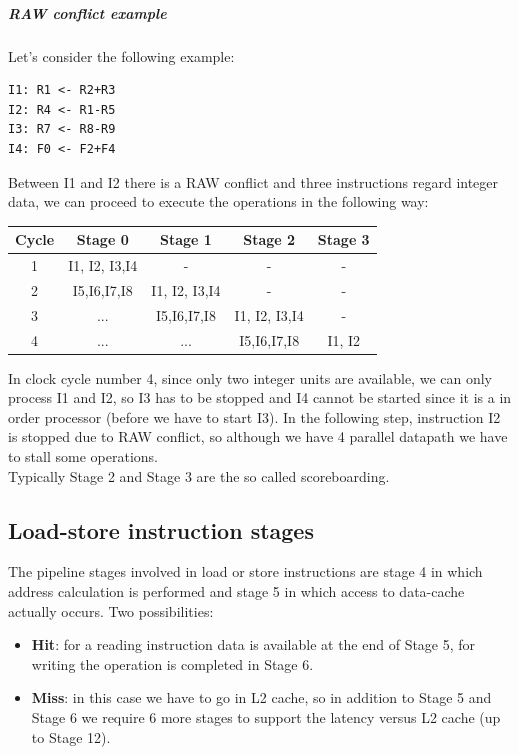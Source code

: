 \subparagraph{RAW conflict example}
Let's consider the following example:
\begin{verbatim}
I1: R1 <- R2+R3
I2: R4 <- R1-R5
I3: R7 <- R8-R9
I4: F0 <- F2+F4
\end{verbatim}

Between I1 and I2 there is a RAW conflict and three instructions regard integer
data, we can proceed to execute the operations in the following way:

\begin{center}
  \begin{tabular}{|c|c|c|c|c|}
  \hline
  Cycle&    Stage 0&    Stage 1&      Stage 2&    Stage 3\\
  \hline
  1&    I1, I2, I3,I4&    - &         - &         -\\
  2&    I5,I6,I7,I8&    I1, I2, I3,I4&    -&          -\\
  3&    ...&        I5,I6,I7,I8&    I1, I2, I3,I4&    -\\
  4&    ...&        ...&        I5,I6,I7,I8&    I1, I2\\
  \hline
  \end{tabular}
\end{center}

In clock cycle number 4, since only two integer units are available, we can
only process I1 and I2, so I3 has to be stopped and I4 cannot be started since
it is a in order processor (before we have to start I3). In the following step,
instruction I2 is stopped due to RAW conflict, so although we have 4 parallel
datapath we have to stall some operations.\\

Typically Stage 2 and Stage 3 are the so called scoreboarding.

\subsection{Load-store instruction stages}
The pipeline stages involved in load or store instructions are stage 4 in which
address calculation is performed and stage 5 in which access to data-cache
actually occurs. Two possibilities:

\begin{itemize}
  \item \textbf{Hit}: for a reading instruction data is available at the end
  of Stage 5, for writing the operation is completed in Stage 6.
  \item \textbf{Miss}: in this case we have to go in L2 cache, so in addition
  to Stage 5 and Stage 6 we require 6 more stages to support the latency
  versus L2 cache (up to Stage 12).
\end{itemize}

